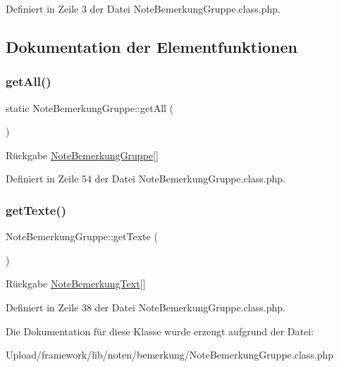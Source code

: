 Definiert in Zeile 3 der Datei Note\+Bemerkung\+Gruppe.\+class.\+php.



\subsection{Dokumentation der Elementfunktionen}
\mbox{\label{class_note_bemerkung_gruppe_a2bd0a9d8dd4b025d28fc0f2a7a01096f}} 
\subsubsection{\texorpdfstring{get\+All()}{getAll()}}
{\footnotesize\ttfamily static Note\+Bemerkung\+Gruppe\+::get\+All (\begin{DoxyParamCaption}{ }\end{DoxyParamCaption})\hspace{0.3cm}{\ttfamily [static]}}

\begin{DoxyReturn}{Rückgabe}
\mbox{\hyperlink{class_note_bemerkung_gruppe}{Note\+Bemerkung\+Gruppe}}\mbox{[}\mbox{]} 
\end{DoxyReturn}


Definiert in Zeile 54 der Datei Note\+Bemerkung\+Gruppe.\+class.\+php.

\mbox{\label{class_note_bemerkung_gruppe_a1815dda07a342042aee279d62da17d1e}} 
\subsubsection{\texorpdfstring{get\+Texte()}{getTexte()}}
{\footnotesize\ttfamily Note\+Bemerkung\+Gruppe\+::get\+Texte (\begin{DoxyParamCaption}{ }\end{DoxyParamCaption})}

\begin{DoxyReturn}{Rückgabe}
\mbox{\hyperlink{class_note_bemerkung_text}{Note\+Bemerkung\+Text}}\mbox{[}\mbox{]} 
\end{DoxyReturn}


Definiert in Zeile 38 der Datei Note\+Bemerkung\+Gruppe.\+class.\+php.



Die Dokumentation für diese Klasse wurde erzeugt aufgrund der Datei\+:\begin{DoxyCompactItemize}
\item 
Upload/framework/lib/noten/bemerkung/Note\+Bemerkung\+Gruppe.\+class.\+php\end{DoxyCompactItemize}
